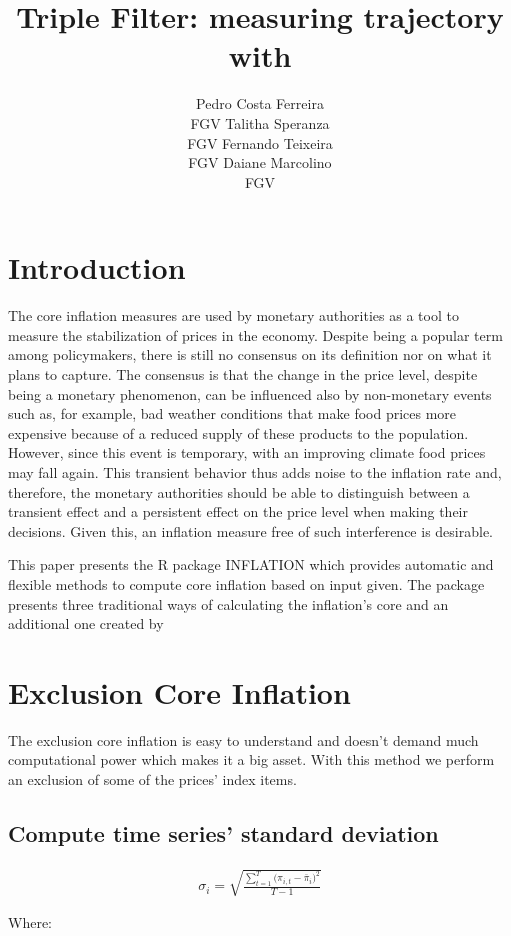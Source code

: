 \documentclass[article]{jss}
\author{
Pedro Costa Ferreira\\FGV \And Talitha Speranza\\FGV \And Fernando Teixeira\\FGV \And Daiane Marcolino\\FGV
}
\title{Triple Filter: measuring trajectory with \pkg{INFLATION}}
\begin{document}
\section{Introduction}\label{introduction}

The core inflation measures are used by monetary authorities as a tool
to measure the stabilization of prices in the economy. Despite being a
popular term among policymakers, there is still no consensus on its
definition nor on what it plans to capture. The consensus is that the
change in the price level, despite being a monetary phenomenon, can be
influenced also by non-monetary events such as, for example, bad weather
conditions that make food prices more expensive because of a reduced
supply of these products to the population. However, since this event is
temporary, with an improving climate food prices may fall again. This
transient behavior thus adds noise to the inflation rate and, therefore,
the monetary authorities should be able to distinguish between a
transient effect and a persistent effect on the price level when making
their decisions. Given this, an inflation measure free of such
interference is desirable.

This paper presents the R \citep{rproj} package INFLATION \citep{inf}
which provides automatic and flexible methods to compute core inflation
based on input given. The package presents three traditional ways of
calculating the inflation's core and an additional one created by
\citep{triple}

\section{Exclusion Core Inflation}\label{exclusion-core-inflation}

The exclusion core inflation is easy to understand and doesn't demand
much computational power which makes it a big asset. With this method we
perform an exclusion of some of the prices' index items.

\subsection{Compute time series' standard
deviation}\label{compute-time-series-standard-deviation}

\begin{align}
\sigma_{i} = \sqrt{\frac{\sum\nolimits_{t=1}^{T}{(\pi_{i,t}-\bar{\pi}_{i}})^2}{T-1}}
\end{align}

Where:
\end{document}
